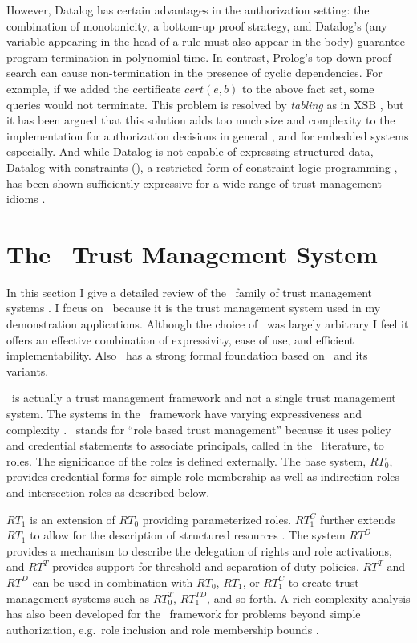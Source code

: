 However, Datalog has certain advantages in the authorization setting: the combination of
monotonicity, a bottom-up proof strategy, and Datalog's  (any variable
appearing in the head of a rule must also appear in the body) guarantee program termination in
polynomial time. In contrast, Prolog's top-down proof search can cause non-termination in the
presence of cyclic dependencies. For example, if we added the certificate $\mathit{cert}(e,b)$
to the above fact set, some queries would not terminate. This problem is resolved by
\emph{tabling} as in XSB \cite{xsb-page}, but it has been argued that this solution adds too
much size and complexity to the implementation for authorization decisions in general
\cite{Li:DRBTMF}, and for embedded systems especially. And while Datalog is not capable of
expressing structured data, Datalog with constraints (\datalogc), a restricted form of
constraint logic programming \cite{jaffar-maher-jlp94}, has been shown sufficiently expressive
for a wide range of trust management idioms \cite{Li:DCFTML}.

\section{The \RT\ Trust Management System}
\label{section-rt}

In this section I give a detailed review of the \RT\ family of trust management systems
\cite{Li:DRBTMF}. I focus on \RT\ because it is the trust management system used in my
demonstration applications. Although the choice of \RT\ was largely arbitrary I feel it offers
an effective combination of expressivity, ease of use, and efficient implementability. Also
\RT\ has a strong formal foundation based on \datalog\ and its variants.

\RT\ is actually a trust management framework and not a single trust management system. The
systems in the \RT\ framework have varying expressiveness and complexity
\cite{Li:DRBTMF,Li:DCDTM,Li:RRBTMF}. \RT\ stands for ``role based trust management'' because it
uses policy and credential statements to associate principals, called  in the
\RT\ literature, to roles. The significance of the roles is defined externally. The base
system, $RT_0$, provides credential forms for simple role membership as well as indirection
roles and intersection roles as described below.

$RT_1$ is an extension of $RT_0$ providing parameterized roles. $RT_1^C$ further extends
$RT_1$ to allow for the description of structured resources \cite{Li:DCFTML,Li:RRBTMF}. The
system $RT^D$ provides a mechanism to describe the delegation of rights and role activations,
and $RT^T$ provides support for threshold and separation of duty policies. $RT^T$ and $RT^D$
can be used in combination with $RT_0$, $RT_1$, or $RT_1^C$ to create trust management
systems such as $RT_0^T$, $RT_1^{TD}$, and so forth. A rich complexity analysis has also been
developed for the \RT\ framework for problems beyond simple authorization, e.g.~role inclusion
and role membership bounds \cite{Li:BPOCSATM}.

